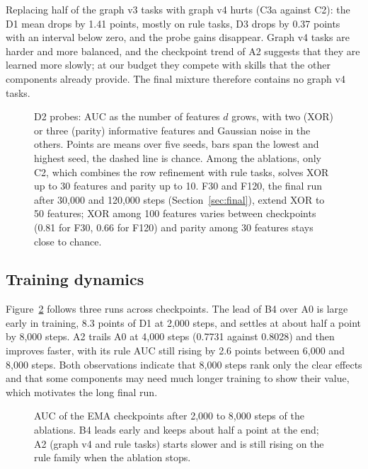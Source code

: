 \documentclass[11pt]{article}
\begin{document}
Replacing half of the graph v3 tasks with graph v4 hurts (C3a against C2): the D1 mean drops by 1.41
points, mostly on rule tasks, D3 drops by 0.37 points with an interval below zero, and the probe gains
disappear. Graph v4 tasks are harder and more balanced, and the checkpoint trend of A2 suggests that
they are learned more slowly; at our budget they compete with skills that the other components
already provide. The final mixture therefore contains no graph v4 tasks.

\begin{figure}[tbp]
\centering

\caption{D2 probes: AUC as the number of features $d$ grows, with two (XOR) or three (parity)
informative features and Gaussian noise in the others. Points are means over five seeds, bars span
the lowest and highest seed, the dashed line is chance. Among the ablations, only C2, which combines
the row refinement with rule tasks, solves XOR up to 30 features and parity up to 10. F30 and F120, the
final run after 30,000 and 120,000 steps (Section~\ref{sec:final}), extend XOR to 50 features; XOR among
100 features varies between checkpoints (0.81 for F30, 0.66 for F120) and parity among 30 features
stays close to chance.}
\label{fig:probes}
\end{figure}

\subsection{Training dynamics}
Figure~\ref{fig:trend} follows three runs across checkpoints. The lead of B4 over A0 is large early in
training, 8.3 points of D1 at 2,000 steps, and settles at about half a point by 8,000 steps. A2 trails
A0 at 4,000 steps (0.7731 against 0.8028) and then improves faster, with its rule AUC still rising by
2.6 points between 6,000 and 8,000 steps. Both observations indicate that 8,000 steps rank only the clear effects and
that some components may need much longer training to show their value, which motivates the long
final run.

\begin{figure}[tbp]
\centering

\caption{AUC of the EMA checkpoints after 2,000 to 8,000 steps of the ablations. B4 leads early and
keeps about half a point at the end; A2 (graph v4 and rule tasks) starts slower and is still rising
on the rule family when the ablation stops.}
\label{fig:trend}
\end{figure}
\end{document}
